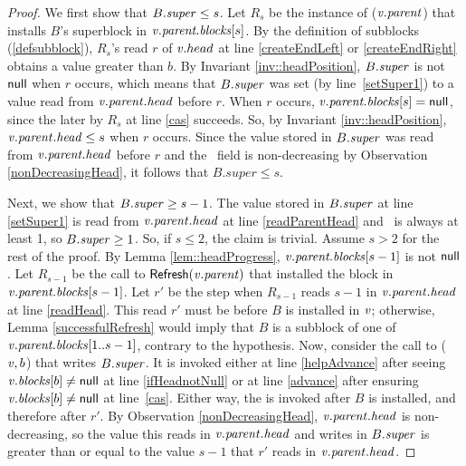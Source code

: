 \begin{proof}
We first show that $B.\mbox{\textit{super}}\leq s$.
Let $R_s$ be the instance of ($\mbox{\textnormal{\textit{v}}}.\mbox{\textit{parent}}$) that installs $B$'s superblock 
in $\mbox{\textnormal{\textit{v}}}.\mbox{\textit{parent.blocks}}[s]$.
By the definition of subblocks (\ref{defsubblock}), $R_s$'s read $r$ of $\mbox{\textnormal{\textit{v}}}.head$ at line \ref{createEndLeft} or \ref{createEndRight} obtains a value greater than $b$.
By Invariant \ref{inv::headPosition}, $B.\mbox{\textit{super}}$ is not $\mbox{\sf null}$ when $r$ occurs, which means
that $B.\mbox{\textit{super}}$ was set (by line~\ref{setSuper1}) to a value read from $\mbox{\textnormal{\textit{v}}}.\mbox{\textit{parent}}.\mbox{\textit{head}}$ before $r$.
When $r$ occurs, $\mbox{\textnormal{\textit{v}}}.\mbox{\textit{parent.blocks}}[s] = \mbox{\sf null}$, since the later  by $R_s$ at line
\ref{cas} succeeds.
So, by Invariant \ref{inv::headPosition}, $\mbox{\textnormal{\textit{v}}}.\mbox{\textit{parent}}.\mbox{\textit{head}} \leq s$ when $r$ occurs.
Since the value stored in $B.\mbox{\textit{super}}$ was read from $\mbox{\textnormal{\textit{v}}}.\mbox{\textit{parent.head}}$ before $r$ and the \head\ field is non-decreasing by Observation \ref{nonDecreasingHead}, it follows that $B.super\leq s$.

Next, we show that $B.\mbox{\textit{super}}\geq s-1$.
The value stored in $B.\mbox{\textit{super}}$ at line \ref{setSuper1} is read from $\mbox{\textnormal{\textit{v}}}.\mbox{\textit{parent}}.\mbox{\textit{head}}$ at line \ref{readParentHead} and \head\ is always at least 1, so $B.\mbox{\textit{super}} \geq 1$.
So, if $s\leq 2$, the claim is trivial.  Assume $s>2$ for the rest of the proof.
By Lemma \ref{lem::headProgress}, $\mbox{\textnormal{\textit{v}}}.\mbox{\textit{parent.blocks}}[s-1]$ is not $\mbox{\sf null}$.  Let $R_{s-1}$ be the call to
${\sf Refresh}(\mbox{\textnormal{\textit{v}}}.\mbox{\textit{parent}})$ that installed the block in $\mbox{\textnormal{\textit{v}}}.\mbox{\textit{parent.blocks}}[s-1]$.
Let $r'$ be the step when $R_{s-1}$ reads $s-1$ in $\mbox{\textnormal{\textit{v}}}.\mbox{\textit{parent}}.\mbox{\textit{head}}$ at line \ref{readHead}.
This read $r'$ must be before $B$ is installed in $\mbox{\textnormal{\textit{v}}}$;
otherwise, Lemma \ref{successfulRefresh} would imply that $B$ is a subblock of one of 
$\mbox{\textnormal{\textit{v}}}.\mbox{\textit{parent.blocks}}[1..s-1]$, contrary to the hypothesis.
Now, consider the call to ($\mbox{\textnormal{\textit{v}}}, b$) that writes $B.\mbox{\textit{super}}$.
It is invoked either 
at line \ref{helpAdvance} after seeing $\mbox{\textnormal{\textit{v}}}.\mbox{\textit{blocks}}[b]\neq \mbox{\sf null}$ at line \ref{ifHeadnotNull}
or at line \ref{advance} after ensuring $\mbox{\textnormal{\textit{v}}}.\mbox{\textit{blocks}}[b]\neq \mbox{\sf null}$ at line~\ref{cas}.
Either way, the  is invoked after $B$ is installed, and therefore after $r'$.
By Observation \ref{nonDecreasingHead}, $\mbox{\textnormal{\textit{v}}}.\mbox{\textit{parent}}.\mbox{\textit{head}}$ is non-decreasing, so 
the value this  reads in $\mbox{\textnormal{\textit{v}}}.\mbox{\textit{parent}}.\mbox{\textit{head}}$ and
writes in $B.\mbox{\textit{super}}$ is greater than or equal to the value $s-1$ that $r'$ reads in $\mbox{\textnormal{\textit{v}}}.\mbox{\textit{parent}}.\mbox{\textit{head}}$.
\end{proof}


